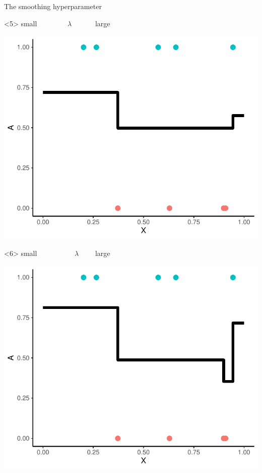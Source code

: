 \documentclass[smaller]{beamer}\usepackage{listings}
\begin{document}
\begin{frame}[label={sec:org87d521d}]{The smoothing hyperparameter}
\begin{onlyenv}<5>
\center small \(\quad \quad \quad \quad   \lambda \quad \quad \quad\) large

\begin{center}
\includegraphics[width=.9\linewidth]{./hal-smoothing3.pdf}
\end{center}
\end{onlyenv}

\begin{onlyenv}<6>
\center small \(\quad \quad \quad \quad \quad   \lambda \quad \quad\) large

\begin{center}
\includegraphics[width=.9\linewidth]{./hal-smoothing4.pdf}
\end{center}
\end{onlyenv}


\end{frame}
\end{document}
